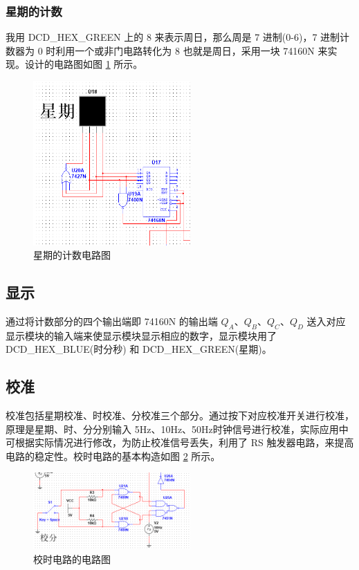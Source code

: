 \subsubsection{星期的计数}

我用 DCD\_HEX\_GREEN 上的 8 来表示周日，那么周是 7 进制(0-6)，7 进制计数器为 0 时利用一个或非门电路转化为 8 也就是周日，采用一块 74160N 来实现。设计的电路图如图 \ref{fig:week} 所示。

\begin{figure}[hbtp]
	\centering
	\includegraphics[width=6cm]{figure/week.png}
	\caption{星期的计数电路图}\label{fig:week}
\end{figure}

\subsection{显示}

通过将计数部分的四个输出端即 74160N 的输出端 $Q_A$、$Q_B$、$Q_C$、$Q_D$ 送入对应显示模块的输入端来使显示模块显示相应的数字，显示模块用了 DCD\_HEX\_BLUE(时分秒) 和 DCD\_HEX\_GREEN(星期)。

\subsection{校准}

校准包括星期校准、时校准、分校准三个部分。通过按下对应校准开关进行校准，原理是星期、时、分分别输入 5Hz、10Hz、50Hz时钟信号进行校准，实际应用中可根据实际情况进行修改，为防止校准信号丢失，利用了 RS 触发器电路，来提高电路的稳定性。校时电路的基本构造如图 \ref{fig:checkout} 所示。

\begin{figure}[hbtp]
	\centering
	\includegraphics[width=6cm]{figure/checkout.png}
	\caption{校时电路的电路图}\label{fig:checkout}
\end{figure}

